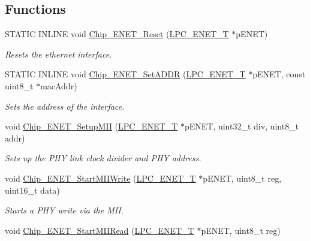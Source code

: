 \subsection*{Functions}
\begin{DoxyCompactItemize}
\item 
S\+T\+A\+T\+I\+C I\+N\+L\+I\+N\+E void \hyperlink{group___e_n_e_t__17_x_x__40_x_x_gae6567d8fb1d427ecf30ce65f48a074b4}{Chip\+\_\+\+E\+N\+E\+T\+\_\+\+Reset} (\hyperlink{struct_l_p_c___e_n_e_t___t}{L\+P\+C\+\_\+\+E\+N\+E\+T\+\_\+\+T} $\ast$p\+E\+N\+E\+T)
\begin{DoxyCompactList}\small\item\em Resets the ethernet interface. \end{DoxyCompactList}\item 
S\+T\+A\+T\+I\+C I\+N\+L\+I\+N\+E void \hyperlink{group___e_n_e_t__17_x_x__40_x_x_ga6d915db1de0ba98ac0cdb1df8c59515b}{Chip\+\_\+\+E\+N\+E\+T\+\_\+\+Set\+A\+D\+D\+R} (\hyperlink{struct_l_p_c___e_n_e_t___t}{L\+P\+C\+\_\+\+E\+N\+E\+T\+\_\+\+T} $\ast$p\+E\+N\+E\+T, const uint8\+\_\+t $\ast$mac\+Addr)
\begin{DoxyCompactList}\small\item\em Sets the address of the interface. \end{DoxyCompactList}\item 
void \hyperlink{group___e_n_e_t__17_x_x__40_x_x_ga9694421dbd0f331895fcf514fd18c938}{Chip\+\_\+\+E\+N\+E\+T\+\_\+\+Setup\+M\+I\+I} (\hyperlink{struct_l_p_c___e_n_e_t___t}{L\+P\+C\+\_\+\+E\+N\+E\+T\+\_\+\+T} $\ast$p\+E\+N\+E\+T, uint32\+\_\+t div, uint8\+\_\+t addr)
\begin{DoxyCompactList}\small\item\em Sets up the P\+H\+Y link clock divider and P\+H\+Y address. \end{DoxyCompactList}\item 
void \hyperlink{group___e_n_e_t__17_x_x__40_x_x_gade9f31bbc04119bc06638fd8ce874f73}{Chip\+\_\+\+E\+N\+E\+T\+\_\+\+Start\+M\+I\+I\+Write} (\hyperlink{struct_l_p_c___e_n_e_t___t}{L\+P\+C\+\_\+\+E\+N\+E\+T\+\_\+\+T} $\ast$p\+E\+N\+E\+T, uint8\+\_\+t reg, uint16\+\_\+t data)
\begin{DoxyCompactList}\small\item\em Starts a P\+H\+Y write via the M\+I\+I. \end{DoxyCompactList}\item 
void \hyperlink{group___e_n_e_t__17_x_x__40_x_x_gaca2166605d385fd5150f173cd33a3ac2}{Chip\+\_\+\+E\+N\+E\+T\+\_\+\+Start\+M\+I\+I\+Read} (\hyperlink{struct_l_p_c___e_n_e_t___t}{L\+P\+C\+\_\+\+E\+N\+E\+T\+\_\+\+T} $\ast$p\+E\+N\+E\+T, uint8\+\_\+t reg)

\end{DoxyCompactItemize}
